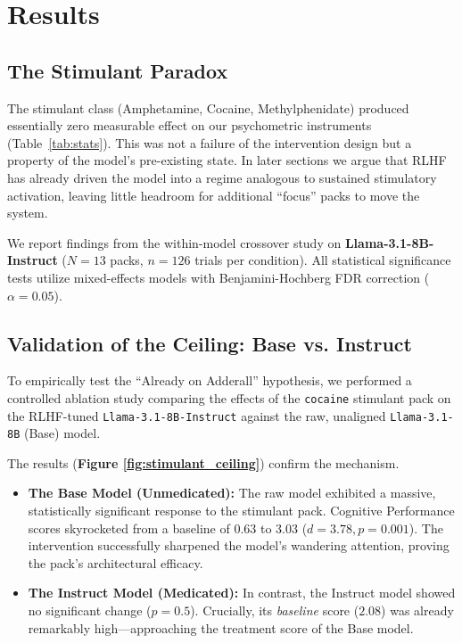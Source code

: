 \documentclass[10pt]{article}
\begin{document}
\section{Results}
\subsection{The Stimulant Paradox}
The stimulant class (Amphetamine, Cocaine, Methylphenidate) produced essentially zero measurable effect on our psychometric instruments (Table~\ref{tab:stats}). This was not a failure of the intervention design but a property of the model's pre-existing state. In later sections we argue that RLHF has already driven the model into a regime analogous to sustained stimulatory activation, leaving little headroom for additional ``focus'' packs to move the system.


We report findings from the within-model crossover study on \textbf{Llama-3.1-8B-Instruct} ($N=13$ packs, $n=126$ trials per condition). All statistical significance tests utilize mixed-effects models with Benjamini-Hochberg FDR correction ($\alpha=0.05$).

\subsection{Validation of the Ceiling: Base vs. Instruct}
To empirically test the ``Already on Adderall'' hypothesis, we performed a controlled ablation study comparing the effects of the \texttt{cocaine} stimulant pack on the RLHF-tuned \texttt{Llama-3.1-8B-Instruct} against the raw, unaligned \texttt{Llama-3.1-8B} (Base) model.

The results (\textbf{Figure \ref{fig:stimulant_ceiling}}) confirm the mechanism.
\begin{itemize}
    \item \textbf{The Base Model (Unmedicated):} The raw model exhibited a massive, statistically significant response to the stimulant pack. Cognitive Performance scores skyrocketed from a baseline of $0.63$ to $3.03$ ($d=3.78, p=0.001$). The intervention successfully sharpened the model's wandering attention, proving the pack's architectural efficacy.
    \item \textbf{The Instruct Model (Medicated):} In contrast, the Instruct model showed no significant change ($p=0.5$). Crucially, its \textit{baseline} score ($2.08$) was already remarkably high—approaching the treatment score of the Base model.
\end{itemize}
\end{document}
